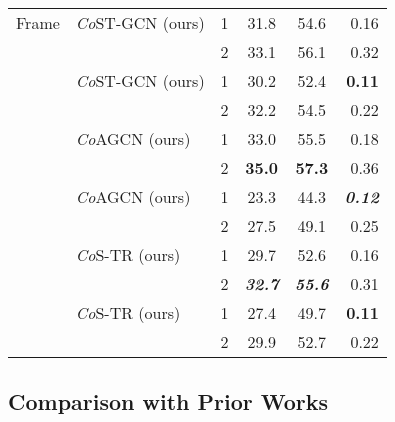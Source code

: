 \documentclass[journal]{IEEEtran}
\newcommand\paretocolor{lgreen!20}
\theoremstyle{definition}
\begin{document}
\begin{table}[!tbp]
\begin{center}
{\begin{tabular}{llcccr}
    \midrule
    Frame 
    & \textit{Co}ST-GCN (ours)                                  & 1     & 31.8      & 54.6  & 0.16 \\
    &                                                           & 2     & 33.1      & 56.1  & 0.32 \\
    & \textit{Co}ST-GCN (ours)                              & 1     & \colorbox{\paretocolor}{30.2}      & \colorbox{\paretocolor}{52.4}  &  \colorbox{\paretocolor}{\textbf{0.11}} \\
    &                                                           & 2     & \colorbox{\paretocolor}{32.2}      & \colorbox{\paretocolor}{54.5}  & \colorbox{\paretocolor}{0.22} \\
    & \textit{Co}AGCN (ours)                                    & 1     & \colorbox{\paretocolor}{33.0}      & \colorbox{\paretocolor}{55.5}  & \colorbox{\paretocolor}{0.18} \\
    &                                                           & 2     & \colorbox{\paretocolor}{\textbf{35.0}}      & \colorbox{\paretocolor}{\textbf{57.3}}  & \colorbox{\paretocolor}{0.36} \\
    & \textit{Co}AGCN (ours)                                & 1     & 23.3      & 44.3  & \textbf{\textit{0.12}} \\
    &                                                           & 2     & 27.5      & 49.1  & 0.25 \\
    & \textit{Co}S-TR (ours)                                    & 1     & 29.7      & 52.6  & 0.16 \\
    &                                                           & 2     & \colorbox{\paretocolor}{\textbf{\textit{32.7}}}      & \colorbox{\paretocolor}{\textbf{\textit{55.6}}}  & \colorbox{\paretocolor}{0.31} \\
    & \textit{Co}S-TR (ours)                                & 1     & 27.4      & 49.7  & \textbf{0.11} \\
    &                                                           & 2     & 29.9      & 52.7  & 0.22 \\
    \bottomrule
\end{tabular}
}
\end{center}
\vspace{-10pt}
\end{table}


\subsection{Comparison with Prior Works}
\end{document}
